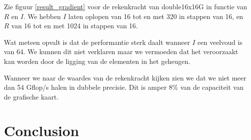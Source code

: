 \documentclass[11pt]{IEEEtran}
\begin{document}
Zie figuur \ref{result_gradient} voor de rekenkracht van double16x16G in functie van $R$ en $I$. We hebben $I$ laten oplopen van 16 tot en met 320 in stappen van 16, en $R$ van 16 tot en met 1024 in stappen van 16.

Wat meteen opvalt is dat de performantie sterk daalt wanneer $I$ een veelvoud is van 64. We kunnen dit niet verklaren maar we vermoeden dat het veroorzaakt kan worden door de ligging van de elementen in het geheugen.

Wanneer we naar de waardes van de rekenkracht kijken zien we dat we niet meer dan 54 Gflop/s halen in dubbele precisie. Dit is amper 8\% van de capaciteit van de grafische kaart.

\section{Conclusion}



\end{document}
